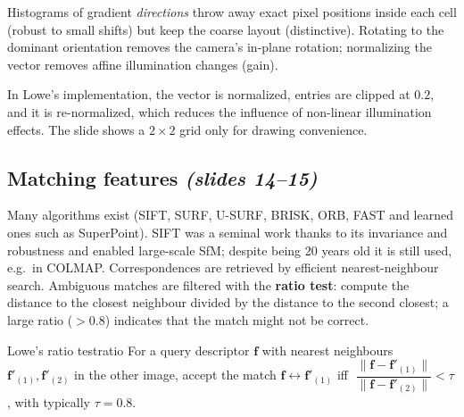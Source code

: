 \documentclass[11pt,a4paper]{article}
\newcommand{\slr}[1]{\texorpdfstring{\emph{(slides #1)}}{(slides #1)}}
\newcommand{\norm}[1]{\lVert #1\rVert}
\begin{document}
\begin{intuition}
Histograms of gradient \emph{directions} throw away exact pixel positions inside each cell (robust to small shifts) but keep
the coarse layout (distinctive). Rotating to the dominant orientation removes the camera's in-plane rotation; normalizing the vector
removes affine illumination changes (gain).
\end{intuition}

\begin{beyond}
In Lowe's implementation, the vector is normalized, entries are clipped at $0.2$, and it is re-normalized, which reduces the
influence of non-linear illumination effects. The slide shows a $2\times2$ grid only for drawing convenience.
\end{beyond}

\subsection{Matching features \slr{14--15}}
Many algorithms exist (SIFT, SURF, U-SURF, BRISK, ORB, FAST and learned ones such as SuperPoint). SIFT was a seminal work thanks to its
invariance and robustness and enabled large-scale SfM; despite being 20 years old it is still used, e.g.\ in COLMAP.
Correspondences are retrieved by efficient nearest-neighbour search. Ambiguous matches are filtered with the \textbf{ratio test}:
compute the distance to the closest neighbour divided by the distance to the second closest; a large ratio ($>0.8$) indicates that the
match might not be correct.

\begin{definition}{Lowe's ratio test}{ratio}
For a query descriptor $\bm f$ with nearest neighbours $\bm f'_{(1)},\bm f'_{(2)}$ in the other image, accept the match
$\bm f\leftrightarrow\bm f'_{(1)}$ iff $\;\dfrac{\norm{\bm f-\bm f'_{(1)}}}{\norm{\bm f-\bm f'_{(2)}}}<\tau$, with typically $\tau=0.8$.
\end{definition}
\end{document}

